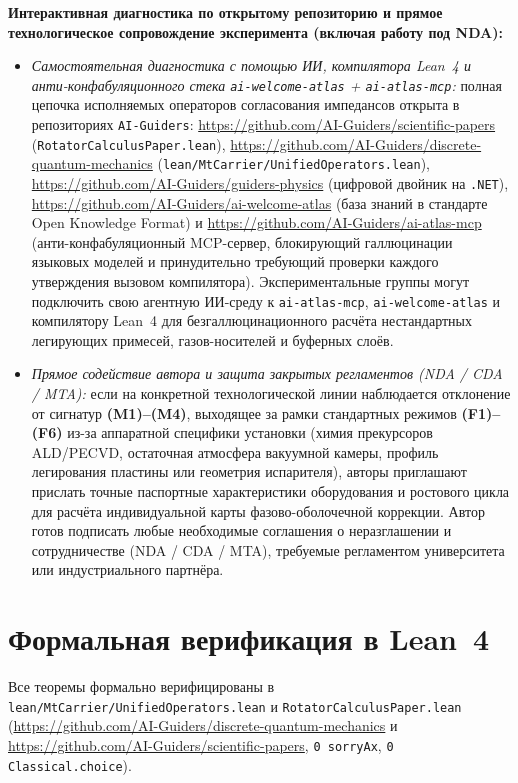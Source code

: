 \documentclass[11pt,a4paper]{article}
\theoremstyle{plain}
\theoremstyle{definition}
\begin{document}
\noindent\textbf{Интерактивная диагностика по открытому репозиторию и прямое технологическое сопровождение эксперимента (включая работу под NDA):}
\begin{itemize}[leftmargin=*,noitemsep]
\item \emph{Самостоятельная диагностика с помощью ИИ, компилятора Lean~4 и анти-конфабуляционного стека \texttt{ai-welcome-atlas} + \texttt{ai-atlas-mcp}:} полная цепочка исполняемых операторов согласования импедансов открыта в репозиториях \texttt{AI-Guiders}: \url{https://github.com/AI-Guiders/scientific-papers} (\texttt{RotatorCalculusPaper.lean}), \url{https://github.com/AI-Guiders/discrete-quantum-mechanics} (\texttt{lean/MtCarrier/UnifiedOperators.lean}), \url{https://github.com/AI-Guiders/guiders-physics} (цифровой двойник на \texttt{.NET}), \url{https://github.com/AI-Guiders/ai-welcome-atlas} (база знаний в стандарте Open Knowledge Format) и \url{https://github.com/AI-Guiders/ai-atlas-mcp} (анти-конфабуляционный MCP-сервер, блокирующий галлюцинации языковых моделей и принудительно требующий проверки каждого утверждения вызовом компилятора). Экспериментальные группы могут подключить свою агентную ИИ-среду к \texttt{ai-atlas-mcp}, \texttt{ai-welcome-atlas} и компилятору Lean~4 для безгаллюцинационного расчёта нестандартных легирующих примесей, газов-носителей и буферных слоёв.
\item \emph{Прямое содействие автора и защита закрытых регламентов (NDA / CDA / MTA):} если на конкретной технологической линии наблюдается отклонение от сигнатур \textbf{(M1)--(M4)}, выходящее за рамки стандартных режимов \textbf{(F1)--(F6)} из-за аппаратной специфики установки (химия прекурсоров ALD/PECVD, остаточная атмосфера вакуумной камеры, профиль легирования пластины или геометрия испарителя), авторы приглашают прислать точные паспортные характеристики оборудования и ростового цикла для расчёта индивидуальной карты фазово-оболочечной коррекции. Автор готов подписать любые необходимые соглашения о неразглашении и сотрудничестве (NDA / CDA / MTA), требуемые регламентом университета или индустриального партнёра.
\end{itemize}

\section{Формальная верификация в Lean~4}
Все теоремы формально верифицированы в \texttt{lean/MtCarrier/UnifiedOperators.lean} и \texttt{RotatorCalculusPaper.lean} (\url{https://github.com/AI-Guiders/discrete-quantum-mechanics} и \url{https://github.com/AI-Guiders/scientific-papers}, \texttt{0 sorryAx}, \texttt{0 Classical.choice}).
\end{document}
